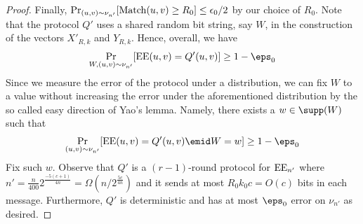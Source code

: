 \begin{proof}
Finally, $\Pr_{(u,v)\sim \nu_{n'}}[\operatorname{Match}(u,v) \ge R_0] \le
\epsilon_0 /2$ by our choice of $R_0$. Note that the protocol
$Q'$ uses a shared random bit string, say $W$, in the
construction of the vectors $X'_{R,k}$ and $Y_{R,k}$. Hence,
overall, we have
\begin{align*}
  \Pr_{W, (u,v)\sim\nu_{n'}}[\EE(u,v) = Q'(u,v)]
      \ge 1 - \eps_0
\end{align*}
Since we measure the error of the protocol under a
distribution, we can fix $W$ to a value without increasing the
error under the aforementioned distribution by the so called
easy direction of Yao's lemma. Namely, there exists a $w\in
\supp(W)$ such that
\begin{align*}
  \Pr_{(u,v)\sim\nu_{n'}}[\EE(u,v)  = Q'(u,v)\emid W=w] 
      \ge 1 - \eps_0
\end{align*}
Fix such $w$. Observe that $Q'$ is a $(r-1)$-round protocol for
$\operatorname{EE}_{n'}$ where
$n'=\frac{n}{400}2^\frac{-5(c+1)}{4n}=\Omega(n/2^\frac{5c}{4n})$
and it sends at most $R_0k_0c = O(c)$ bits in each message.
Furthermore, $Q'$ is deterministic and has at most $\eps_0$
error on $\nu_{n'}$ as desired.
\end{proof}

